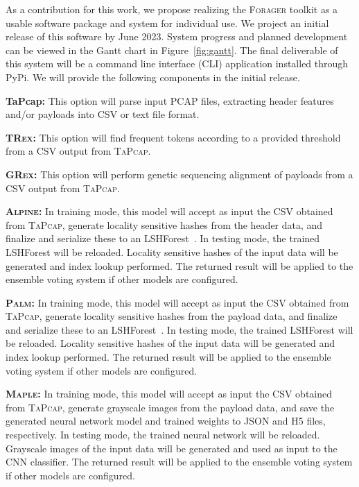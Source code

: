 As a contribution for this work, we propose realizing the \textsc{Forager} toolkit as a usable software package and system for individual use. We project an initial release of this software by June 2023. System progress and planned development can be viewed in the Gantt chart in Figure~\ref{fig:gantt}. The final deliverable of this system will be a command line interface (CLI) application installed through PyPi. We will provide the following components in the initial release.

\medskip

\textbf{TaPcap: } This option will parse input PCAP files, extracting header features and/or payloads into CSV or text file format.

\textbf{\textsc{TRex}: } This option will find frequent tokens according to a provided threshold from a CSV output from \textsc{TaPcap}.

\textbf{\textsc{GRex}: } This option will perform genetic sequencing alignment of payloads from a CSV output from \textsc{TaPcap}.

\textbf{\textsc{Alpine}: } In training mode, this model will accept as input the CSV obtained from \textsc{TaPcap}, generate locality sensitive hashes from the header data, and finalize and serialize these to an LSHForest~\cite{lshforest}. In testing mode, the trained LSHForest will be reloaded. Locality sensitive hashes of the input data will be generated and index lookup performed. The returned result will be applied to the ensemble voting system if other models are configured.

\textbf{\textsc{Palm}: } In training mode, this model will accept as input the CSV obtained from \textsc{TaPcap}, generate locality sensitive hashes from the payload data, and finalize and serialize these to an LSHForest~\cite{lshforest}. In testing mode, the trained LSHForest will be reloaded. Locality sensitive hashes of the input data will be generated and index lookup performed. The returned result will be applied to the ensemble voting system if other models are configured.

\textbf{\textsc{Maple}: } In training mode, this model will accept as input the CSV obtained from \textsc{TaPcap}, generate grayscale images from the payload data, and save the generated neural network model and trained weights to JSON and H5 files, respectively. In testing mode, the trained neural network will be reloaded. Grayscale images of the input data will be generated and used as input to the CNN classifier. The returned result will be applied to the ensemble voting system if other models are configured.

